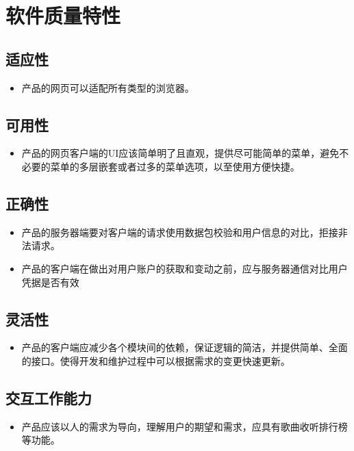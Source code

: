 \chapter{软件质量特性}


\section {适应性}
\begin{itemize}
	\item 产品的网页可以适配所有类型的浏览器。
\end{itemize}

\section {可用性}
\begin{itemize}
	\item 产品的网页客户端的UI应该简单明了且直观，提供尽可能简单的菜单，避免不必要的菜单的多层嵌套或者过多的菜单选项，以至使用方便快捷。
\end{itemize}

\section {正确性}
\begin{itemize}
	\item 产品的服务器端要对客户端的请求使用数据包校验和用户信息的对比，拒接非法请求。
	\item 产品的客户端在做出对用户账户的获取和变动之前，应与服务器通信对比用户凭据是否有效
\end{itemize}

\section {灵活性}
\begin{itemize}
	\item 产品的客户端应减少各个模块间的依赖，保证逻辑的简洁，并提供简单、全面的接口。使得开发和维护过程中可以根据需求的变更快速更新。
\end{itemize}

\section {交互工作能力}
\begin{itemize}
	\item 产品应该以人的需求为导向，理解用户的期望和需求，应具有歌曲收听排行榜等功能。
\end{itemize}

